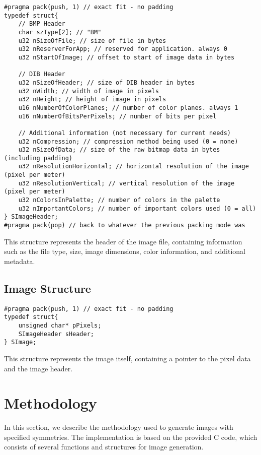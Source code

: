 \documentclass{report}
\begin{document}
\begin{verbatim}
#pragma pack(push, 1) // exact fit - no padding
typedef struct{
    // BMP Header
    char szType[2]; // "BM"
    u32 nSizeOfFile; // size of file in bytes
    u32 nReserverForApp; // reserved for application. always 0
    u32 nStartOfImage; // offset to start of image data in bytes

    // DIB Header
    u32 nSizeOfHeader; // size of DIB header in bytes
    u32 nWidth; // width of image in pixels
    u32 nHeight; // height of image in pixels
    u16 nNumberOfColorPlanes; // number of color planes. always 1
    u16 nNumberOfBitsPerPixels; // number of bits per pixel

    // Additional information (not necessary for current needs)
    u32 nCompression; // compression method being used (0 = none)
    u32 nSizeOfData; // size of the raw bitmap data in bytes (including padding)
    u32 nResolutionHorizontal; // horizontal resolution of the image (pixel per meter)
    u32 nResolutionVertical; // vertical resolution of the image (pixel per meter)
    u32 nColorsInPalette; // number of colors in the palette 
    u32 nImportantColors; // number of important colors used (0 = all)
} SImageHeader;
#pragma pack(pop) // back to whatever the previous packing mode was
\end{verbatim}

This structure represents the header of the image file, containing information such as the file type, size, image dimensions, color information, and additional metadata.

\subsection{Image Structure}

\begin{verbatim}
#pragma pack(push, 1) // exact fit - no padding
typedef struct{
    unsigned char* pPixels;
    SImageHeader sHeader;
} SImage;
\end{verbatim}

This structure represents the image itself, containing a pointer to the pixel data and the image header.



\section{Methodology}
\label{sec:methodology}

In this section, we describe the methodology used to generate images with specified symmetries. The implementation is based on the provided C code, which consists of several functions and structures for image generation.
\end{document}
